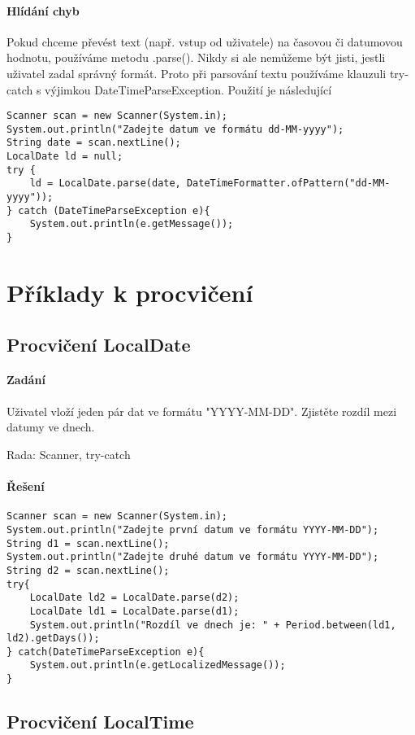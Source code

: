 \documentclass[11pt,a4paper,titlepage]{article}
\begin{document}
\paragraph{Hlídání chyb}
Pokud chceme převést text (např. vstup od uživatele) na časovou či datumovou hodnotu, používáme metodu .parse(). Nikdy si ale nemůžeme být jisti, jestli uživatel zadal správný formát. Proto při parsování textu používáme klauzuli try-catch s výjimkou DateTimeParseException. Použití je následující
\begin{verbatim}
Scanner scan = new Scanner(System.in);
System.out.println("Zadejte datum ve formátu dd-MM-yyyy");
String date = scan.nextLine();
LocalDate ld = null;
try {
    ld = LocalDate.parse(date, DateTimeFormatter.ofPattern("dd-MM-yyyy"));
} catch (DateTimeParseException e){
    System.out.println(e.getMessage());
}
\end{verbatim}
\parencite{java8_datetimeformatter}
\section{Příklady k procvičení}
\subsection{Procvičení LocalDate}
\paragraph{Zadání}
Uživatel vloží jeden pár dat ve formátu "YYYY-MM-DD". Zjistěte rozdíl mezi datumy ve dnech.

Rada: Scanner, try-catch
\paragraph{Řešení}
\begin{verbatim}
Scanner scan = new Scanner(System.in);
System.out.println("Zadejte první datum ve formátu YYYY-MM-DD");
String d1 = scan.nextLine();
System.out.println("Zadejte druhé datum ve formátu YYYY-MM-DD");
String d2 = scan.nextLine();
try{
    LocalDate ld2 = LocalDate.parse(d2);
    LocalDate ld1 = LocalDate.parse(d1);
    System.out.println("Rozdíl ve dnech je: " + Period.between(ld1, ld2).getDays());
} catch(DateTimeParseException e){
    System.out.println(e.getLocalizedMessage());
}
\end{verbatim}
\subsection{Procvičení LocalTime}
\end{document}
